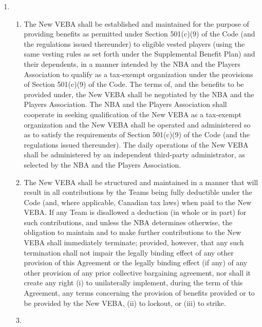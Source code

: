 \documentclass[
]{book}
\providecommand{\tightlist}{%
  \setlength{\itemsep}{0pt}\setlength{\parskip}{0pt}}
\begin{document}
\begin{enumerate}
\def\labelenumi{(\alph{enumi})}
\item
  \begin{enumerate}
  \def\labelenumii{(\arabic{enumii})}
  \tightlist
  \item
    The New VEBA shall be established and maintained for the purpose of providing benefits as permitted under Section 501(c)(9) of the Code (and the regulations issued thereunder) to eligible vested players (using the same vesting rules as set forth under the Supplemental Benefit Plan) and their dependents, in a manner intended by the NBA and the Players Association to qualify as a tax-exempt organization under the provisions of Section 501(c)(9) of the Code. The terms of, and the benefits to be provided under, the New VEBA shall be negotiated by the NBA and the Players Association. The NBA and the Players Association shall cooperate in seeking qualification of the New VEBA as a tax-exempt organization and the New VEBA shall be operated and administered so as to satisfy the requirements of Section 501(c)(9) of the Code (and the regulations issued thereunder). The daily operations of the New VEBA shall be administered by an independent third-party administrator, as selected by the NBA and the Players Association.
  \item
    The New VEBA shall be structured and maintained in a manner that will result in all contributions by the Teams being fully deductible under the Code (and, where applicable, Canadian tax laws) when paid to the New VEBA. If any Team is disallowed a deduction (in whole or in part) for such contributions, and unless the NBA determines otherwise, the obligation to maintain and to make further contributions to the New VEBA shall immediately terminate; provided, however, that any such termination shall not impair the legally binding effect of any other provision of this Agreement or the legally binding effect (if any) of any other provision of any prior collective bargaining agreement, nor shall it create any right (i) to unilaterally implement, during the term of this Agreement, any terms concerning the provision of benefits provided or to be provided by the New VEBA, (ii) to lockout, or (iii) to strike.
  \item

\end{enumerate}
\end{enumerate}
\end{document}
